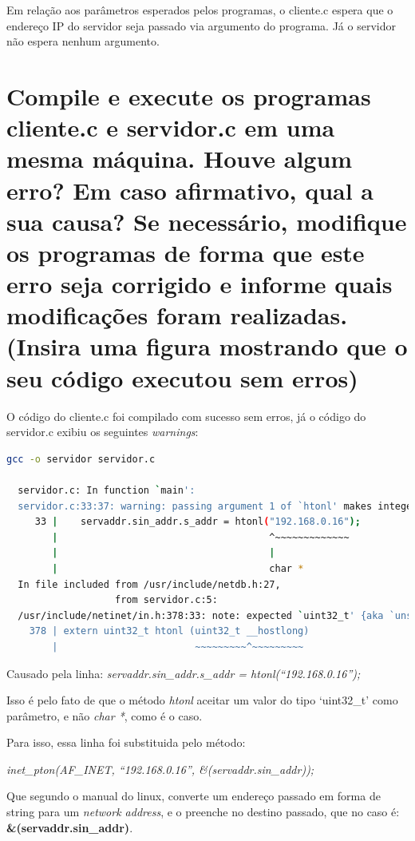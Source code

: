 \documentclass[12pt,a4paper]{report}
\begin{document}
\bigbreak

Em relação aos parâmetros esperados pelos programas, o cliente.c espera que o endereço IP do servidor seja passado via argumento do programa. Já o servidor não espera nenhum argumento.

\section{Compile e execute os programas cliente.c e servidor.c em uma mesma máquina. Houve algum
erro? Em caso afirmativo, qual a sua causa? Se necessário, modifique os programas de forma
que este erro seja corrigido e informe quais modificações foram realizadas. (Insira uma figura
mostrando que o seu código executou sem erros)}

O código do cliente.c foi compilado com sucesso sem erros, já o código do servidor.c exibiu os seguintes \emph{warnings}:

\begin{lstlisting}[language=bash]
  gcc -o servidor servidor.c

  servidor.c: In function `main':
  servidor.c:33:37: warning: passing argument 1 of `htonl' makes integer from pointer without a cast [-Wint-conversion]
     33 |    servaddr.sin_addr.s_addr = htonl("192.168.0.16");
        |                                     ^~~~~~~~~~~~~~
        |                                     |
        |                                     char *
  In file included from /usr/include/netdb.h:27,
                   from servidor.c:5:
  /usr/include/netinet/in.h:378:33: note: expected `uint32_t' {aka `unsigned int'} but argument is of type `char *'
    378 | extern uint32_t htonl (uint32_t __hostlong)
        |                        ~~~~~~~~~^~~~~~~~~~
\end{lstlisting}

Causado pela linha: \emph{servaddr.sin\_addr.s\_addr = htonl(``192.168.0.16'');}

Isso é pelo fato de que o método \emph{htonl} aceitar um valor do tipo `uint32\_t' como parâmetro, e não \emph{char *}, como é o caso. 

\bigbreak

Para isso, essa linha foi substituida pelo método: 

\emph{inet\_pton(AF\_INET, ``192.168.0.16'', \&(servaddr.sin\_addr));}

Que segundo o manual do linux, converte um endereço passado em forma de string para um \emph{network address}, e o preenche no destino passado, que no caso é: \textbf{\&(servaddr.sin\_addr)}.
\end{document}
